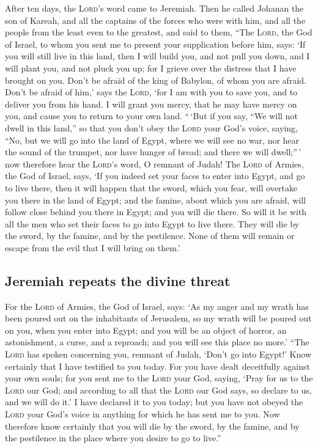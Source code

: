  After ten days, the \textsc{Lord}'s word came to
Jeremiah.  Then he called Johanan the son of Kareah, and
all the captains of the forces who were with him, and all the people
from the least even to the greatest,  and said to them,
``The \textsc{Lord}, the God of Israel, to whom you sent me to present
your supplication before him, says:  `If you will still
live in this land, then I will build you, and not pull you down, and I
will plant you, and not pluck you up; for I grieve over the distress
that I have brought on you.  Don't be afraid of the king
of Babylon, of whom you are afraid. Don't be afraid of him,' says the
\textsc{Lord}, `for I am with you to save you, and to deliver you from
his hand.  I will grant you mercy, that he may have mercy
on you, and cause you to return to your own land. 
``\,`But if you say, ``We will not dwell in this land,'' so that you
don't obey the \textsc{Lord} your God's voice,  saying,
``No, but we will go into the land of Egypt, where we will see no war,
nor hear the sound of the trumpet, nor have hunger of bread; and there
we will dwell;''\,'  now therefore hear the
\textsc{Lord}'s word, O remnant of Judah! The \textsc{Lord} of Armies,
the God of Israel, says, `If you indeed set your faces to enter into
Egypt, and go to live there,  then it will happen that
the sword, which you fear, will overtake you there in the land of Egypt;
and the famine, about which you are afraid, will follow close behind you
there in Egypt; and you will die there.  So will it be
with all the men who set their faces to go into Egypt to live there.
They will die by the sword, by the famine, and by the pestilence. None
of them will remain or escape from the evil that I will bring on them.'

\hypertarget{jeremiah-repeats-the-divine-threat}{%
\subsection{Jeremiah repeats the divine
threat}\label{jeremiah-repeats-the-divine-threat}}

 For the \textsc{Lord} of Armies, the God of Israel,
says: `As my anger and my wrath has been poured out on the inhabitants
of Jerusalem, so my wrath will be poured out on you, when you enter into
Egypt; and you will be an object of horror, an astonishment, a curse,
and a reproach; and you will see this place no more.' 
``The \textsc{Lord} has spoken concerning you, remnant of Judah, `Don't
go into Egypt!' Know certainly that I have testified to you today.
 For you have dealt deceitfully against your own souls;
for you sent me to the \textsc{Lord} your God, saying, `Pray for us to
the \textsc{Lord} our God; and according to all that the \textsc{Lord}
our God says, so declare to us, and we will do it.'  I
have declared it to you today; but you have not obeyed the \textsc{Lord}
your God's voice in anything for which he has sent me to you.
 Now therefore know certainly that you will die by the
sword, by the famine, and by the pestilence in the place where you
desire to go to live.''

